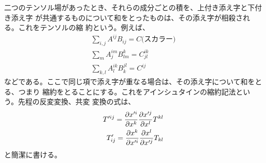         二つのテンソル場があったとき、それらの成分ごとの積を、上付き添え字と下付き添え字
        が共通するものについて和をとったものは、その添え字が相殺される。これをテンソルの縮
        約という。例えば、
        \begin{gather*}
            \sum_{i,j} A^{ij}B_{ij} = C\text{(スカラー)}\\
            \sum_m A^{im}_jB^k_{lm} = C^{ik}_{jl}\\
            \sum_{k,l} A^{ik}_lB^{jl}_k = C^{ij}
        \end{gather*}
        などである。ここで同じ項で添え字が重なる場合は、その添え字について和をとる、つまり
        縮約をとることにする。これをアインシュタインの縮約記法という。先程の反変変換、共変
        変換の式は、
        \begin{eqnarray*}
            T'^{ij} = \pd[x'^i]{x^k}\pd[x'^j]{x^l}T^{kl}\\
            T'_{ij} = \pd[x^k]{x'^i}\pd[x^l]{x'^j}T_{kl}
        \end{eqnarray*}
        と簡潔に書ける。
